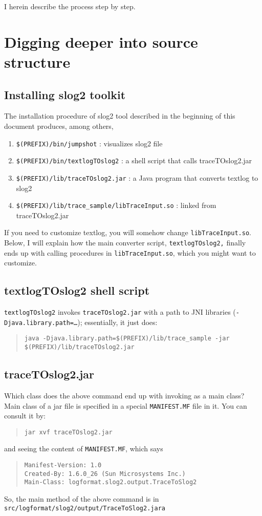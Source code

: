 \documentclass{article}
\begin{document}
I herein describe the process step by step.

\section{Digging deeper into source structure}
\subsection{Installing slog2 toolkit}
The installation procedure of slog2 tool described in the beginning of this document 
produces, among others, 
\begin{enumerate}
\item {\tt \$(PREFIX)/bin/jumpshot} : visualizes slog2 file
\item {\tt \$(PREFIX)/bin/textlogTOslog2} : a shell script that calls traceTOslog2.jar
\item {\tt \$(PREFIX)/lib/traceTOslog2.jar} : a Java program that converts textlog to slog2
\item {\tt \$(PREFIX)/lib/trace\_sample/libTraceInput.so} : linked from traceTOslog2.jar
\end{enumerate}

If you need to customize textlog, you will somehow change {\tt libTraceInput.so}.
Below, I will explain how the main converter script, {\tt textlogTOslog2,} finally 
ends up with calling procedures in {\tt libTraceInput.so}, 
which you might want to customize.

\subsection{textlogTOslog2 shell script}
{\tt textlogTOslog2} invokes {\tt traceTOslog2.jar} with 
a path to JNI libraries ({\tt -Djava.library.path=\ldots}); essentially, it
just does:
\begin{quote}
{\tt java -Djava.library.path=\$(PREFIX)/lib/trace\_sample -jar \$(PREFIX)/lib/traceTOslog2.jar}
\end{quote}

\subsection{traceTOslog2.jar}
Which class does the above command end up with invoking as a main class?
Main class of a jar file is specified in a special {\tt MANIFEST.MF} file in it.
You can consult it by:
\begin{quote}
{\tt jar xvf traceTOslog2.jar}
\end{quote}
and seeing the content of {\tt MANIFEST.MF}, which says
\begin{quote}
\begin{verbatim}
Manifest-Version: 1.0
Created-By: 1.6.0_26 (Sun Microsystems Inc.)
Main-Class: logformat.slog2.output.TraceToSlog2
\end{verbatim}
\end{quote}
So, the main method of the above command is in 
{\tt src/logformat/slog2/output/TraceToSlog2.jara}
\end{document}
